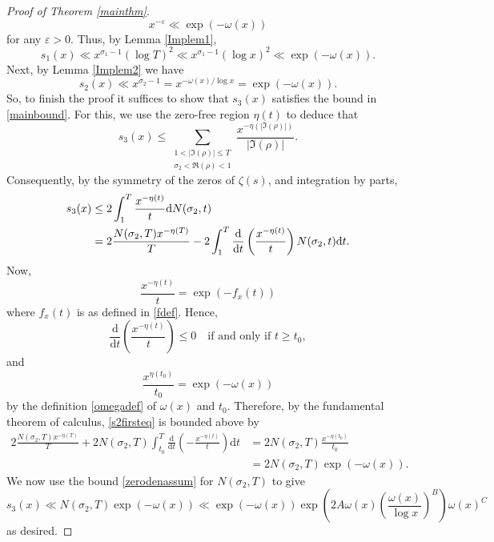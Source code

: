 \documentclass[reqno]{amsart}
\numberwithin{equation}{section}
\theoremstyle{remark}
\begin{document}
\begin{proof}[Proof of Theorem \ref{mainthm}]
\begin{equation*}
        x^{-\varepsilon}\ll\exp(-\omega(x))
    \end{equation*}
    for any $\varepsilon>0$. Thus, by Lemma \ref{Implem1},
    \begin{equation*}
        s_1(x)\ll x^{\sigma_1-1}(\log T)^2\ll x^{\sigma_1-1}(\log x)^2\ll\exp(-\omega(x)).
    \end{equation*}
    Next, by Lemma \ref{Implem2} we have
    \begin{equation*}
        s_2(x)\ll x^{\sigma_2-1}=x^{-\omega(x)/\log x}=\exp(-\omega(x)).
    \end{equation*}
    So, to finish the proof it suffices to show that $s_3(x)$ satisfies the bound in \eqref{mainbound}. For this, we use the zero-free region $\eta(t)$ to deduce that
    \begin{equation*}
        s_3(x)\leq\sum_{\substack{1<|\Im(\rho)|\leq T\\ \sigma_2<\Re(\rho)<1}}\frac{x^{-\eta(|\Im(\rho)|)}}{|\Im(\rho)|}.
    \end{equation*}
    Consequently, by the symmetry of the zeros of $\zeta(s)$, and integration by parts,
    \begin{align}
        s_3(x)&\leq 2\int_1^T\frac{x^{-\eta(t)}}{t}\mathrm{d}N(\sigma_2,t)\notag\\
        &=2\frac{N(\sigma_2,T)x^{-\eta(T)}}{T}-2\int_1^T\frac{\mathrm{d}}{\mathrm{d}t}\left(\frac{x^{-\eta(t)}}{t}\right)N(\sigma_2,t)\mathrm{d}t\label{s2firsteq}.
    \end{align}
    Now,
    \begin{equation*}
        \frac{x^{-\eta(t)}}{t}=\exp\left(-f_x(t)\right)
    \end{equation*}
    where $f_x(t)$ is as defined in \eqref{fdef}. Hence, 
    \begin{equation*}
        \frac{\mathrm{d}}{\mathrm{d}t}\left(\frac{x^{-\eta(t)}}{t}\right)\leq 0\quad \text{if and only if $t\geq t_0$},
    \end{equation*}
    and 
    \begin{equation*}
        \frac{x^{\eta(t_0)}}{t_0}=\exp(-\omega(x))
    \end{equation*}
    by the definition \eqref{omegadef} of $\omega(x)$ and $t_0$. Therefore, by the fundamental theorem of calculus, \eqref{s2firsteq} is bounded above by
    \begin{align*}
        2\frac{N(\sigma_2,T)x^{-\eta(T)}}{T}+2N(\sigma_2,T)\int_{t_0}^T\frac{\mathrm{d}}{\mathrm{d}t}\left(-\frac{x^{-\eta(t)}}{t}\right)\mathrm{d}t&=2N(\sigma_2,T)\frac{x^{-\eta(t_0)}}{t_0}\\
        &=2N(\sigma_2,T)\exp(-\omega(x)).
    \end{align*}
    We now use the bound \eqref{zerodenassum} for $N(\sigma_2,T)$ to give
    \begin{equation*}
        s_3(x)\ll N(\sigma_2,T)\exp(-\omega(x))\ll\exp(-\omega(x))\exp\left(2A\omega(x)\left(\frac{\omega(x)}{\log x}\right)^B\right)\omega(x)^C
    \end{equation*}
    as desired.
\end{proof}
\end{document}

